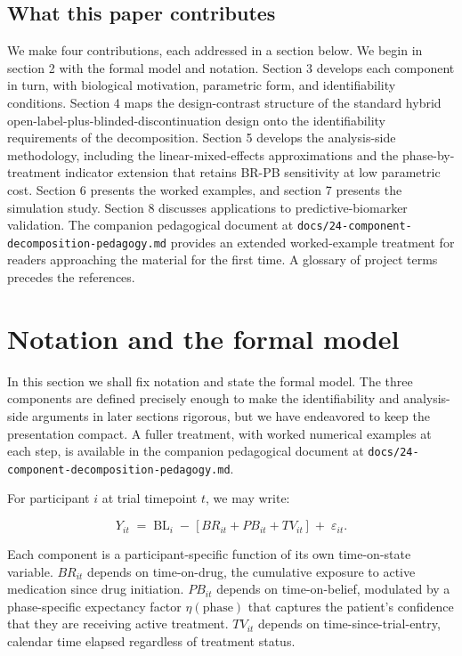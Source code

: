 \documentclass[
  11pt,
]{article}
\begin{document}
\subsection{What this paper contributes}\label{what-this-paper-contributes}

We make four contributions, each addressed in a section below. We begin in
section 2 with the formal model and notation. Section 3 develops each
component in turn, with biological motivation, parametric form, and
identifiability conditions. Section 4 maps the design-contrast structure of
the standard hybrid open-label-plus-blinded-discontinuation design onto the
identifiability requirements of the decomposition. Section 5 develops the
analysis-side methodology, including the linear-mixed-effects approximations
and the phase-by-treatment indicator extension that retains BR-PB sensitivity
at low parametric cost. Section 6 presents the worked examples, and section 7
presents the simulation study. Section 8 discusses applications to
predictive-biomarker validation. The companion pedagogical document at
\texttt{docs/24-component-decomposition-pedagogy.md} provides an extended
worked-example treatment for readers approaching the material for the first
time. A glossary of project terms precedes the references.

\section{Notation and the formal model}\label{notation-and-the-formal-model}

In this section we shall fix notation and state the formal model. The three
components are defined precisely enough to make the identifiability and
analysis-side arguments in later sections rigorous, but we have endeavored to
keep the presentation compact. A fuller treatment, with worked numerical
examples at each step, is available in the companion pedagogical document at
\texttt{docs/24-component-decomposition-pedagogy.md}.

For participant \(i\) at trial timepoint \(t\), we may write:

\[ Y_{it} \;=\; \mathrm{BL}_i \;-\; \bigl[\,BR_{it} + PB_{it} +
TV_{it}\,\bigr] \;+\; \varepsilon_{it}. \]

Each component is a participant-specific function of its own time-on-state
variable. \(BR_{it}\) depends on time-on-drug, the cumulative exposure to active
medication since drug initiation. \(PB_{it}\) depends on time-on-belief,
modulated by a phase-specific expectancy factor \(\eta(\text{phase})\) that
captures the patient's confidence that they are receiving active treatment.
\(TV_{it}\) depends on time-since-trial-entry, calendar time elapsed regardless
of treatment status.
\end{document}
